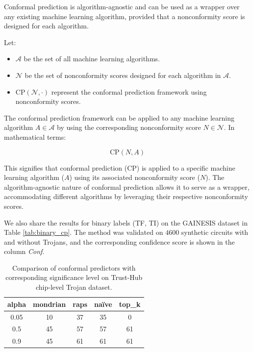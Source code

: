 Conformal prediction is algorithm-agnostic and can be used as a wrapper over any existing machine learning algorithm, provided that a nonconformity score is designed for each algorithm.

Let:
\begin{itemize}
  \item \( \mathcal{A} \) be the set of all machine learning algorithms.
  \item \( \mathcal{N} \) be the set of nonconformity scores designed for each algorithm in \( \mathcal{A} \).
  \item \( \text{CP}(\mathcal{N}, \cdot) \) represent the conformal prediction framework using nonconformity scores.
\end{itemize}

The conformal prediction framework can be applied to any machine learning algorithm \( A \in \mathcal{A} \) by using the corresponding nonconformity score \( N \in \mathcal{N} \). In mathematical terms:

\[ \text{CP}(N, A) \]

This signifies that conformal prediction (\( \text{CP} \)) is applied to a specific machine learning algorithm (\( A \)) using its associated nonconformity score (\( N \)). The algorithm-agnostic nature of conformal prediction allows it to serve as a wrapper, accommodating different algorithms by leveraging their respective nonconformity scores.


We also share the results for binary labels (TF, TI) on the GAINESIS dataset in Table \ref{tab:binary_cp}. The method was validated on $4600$ synthetic circuits with and without Trojans, and the corresponding confidence score is shown in the column \textit{Conf}.

\begin{table}[t]
\centering
\caption{Comparison of conformal predictors with corresponding significance level on Trust-Hub chip-level Trojan dataset.}
\begin{tabular}{ccccc}
\hline
\textbf{alpha} & \textbf{mondrian} & \textbf{raps} & \textbf{naïve} & \textbf{top\_k} \\ \hline
0.05           & 10                & 37            & 35             & 0               \\ \hline
0.5            & 45                & 57            & 57             & 61              \\ \hline
0.9            & 45                & 61            & 61             & 61              \\ \hline
\end{tabular}
\label{tab:racp}
\end{table}

